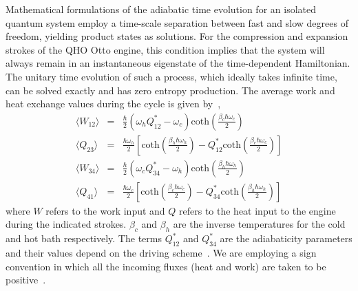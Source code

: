 \documentclass[aps,pra,twocolumn,showpacs,showkeys,groupedaddress,nobalancelastpage,nofootinbib,floatfix,superscriptaddress,longbibliography]{revtex4-2}
\begin{document}
Mathematical formulations of the adiabatic time evolution for an isolated quantum system employ a time-scale separation between fast and slow degrees of freedom, yielding product states as solutions. For the compression and expansion strokes of the QHO Otto engine, this condition implies that the system will always remain in an instantaneous eigenstate of the time-dependent Hamiltonian. The unitary time evolution of such a process, which ideally takes infinite time, can be solved exactly and has zero entropy production. The average work and heat exchange values during the cycle is given by~\cite{PhysRevE.77.021128,DEFFNER2010200},
\begin{eqnarray}\label{adiabatic.cycle}
   \langle W_{12}\rangle &=& \frac{\hbar}{2}(\omega_h Q_{12}^{*} - \omega_c) \text{coth}(\frac{\beta_c \hbar \omega_c}{2}) \\
   \langle Q_{23}\rangle &=& \frac{\hbar \omega_h}{2} \left[\text{coth}(\frac{\beta_h \hbar \omega_h}{2}) - Q_{12}^{*}\text{coth}(\frac{\beta_c \hbar \omega_c}{2}) \right] \\
   \langle W_{34}\rangle &=& \frac{\hbar}{2}(\omega_c Q_{34}^{*} - \omega_h) \text{coth}(\frac{\beta_h \hbar \omega_h}{2}) \\
   \langle Q_{41}\rangle &=& \frac{\hbar \omega_c}{2} \left[\text{coth}(\frac{\beta_c \hbar \omega_c}{2}) - Q_{34}^{*}\text{coth}(\frac{\beta_h \hbar \omega_h}{2}) \right]
\end{eqnarray}
where $W$ refers to the work input and $Q$ refers to the heat input to the engine during the indicated strokes. $\beta_c$ and $\beta_h$ are the inverse temperatures for the cold and hot bath respectively. The terms $Q^*_{12}$ and $Q^*_{34}$ are the adiabaticity parameters and their values depend on the driving scheme~\cite{PhysRevE.98.032121}. We are employing a sign convention in which all the incoming fluxes (heat and work) are taken to be positive~\cite{PhysRevE.106.024137,PhysRevE.102.062123}.\\
\end{document}

